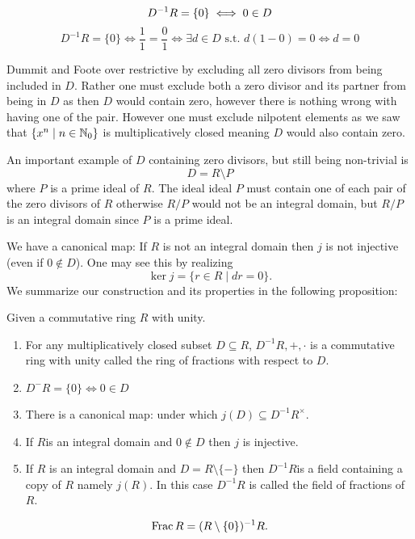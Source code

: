 \documentclass[master.tex]{subfiles}
\begin{document}
  \begin{rmk*}
    \[D^{-1}R = \{0\} \iff 0 \in D\\\]
    \[D^{-1}R = \{0\} \iff \frac{1}{1}=\frac{0}{1} \iff \exists d \in D \text{ s.t. } d(1-0)=0 \iff d=0\]
  \end{rmk*}
  Dummit and Foote over restrictive by excluding all zero divisors from being included in \(D\). Rather one must exclude
  both a zero divisor and its partner from being in \(D\) as then \(D\) would contain zero, however there is nothing
  wrong with having one of the pair. However one must exclude nilpotent elements as we saw that
  \(\{x^n \mid n \in {\mathbb N}_0\}\) is multiplicatively closed meaning \(D\) would also contain zero.
  \begin{example*}
    An important example of \(D\) containing zero divisors, but still being non-trivial is
    \[D=R \setminus P\] where \(P\) is a prime ideal of \(R\). The ideal ideal \(P\) must contain one of each pair of
    the zero divisors of \(R\) otherwise \(R/P\) would not be an integral domain, but \(R/P\) is an integral domain
    since \(P\) is a prime ideal.
  \end{example*}
  We have a canonical map:  If \(R\) is not an integral domain then \(j\)
  is not injective (even if \(0 \not \in D\)). One may see this by realizing
  \[\ker j = \{r \in R \mid dr = 0\}.\]
  We summarize our construction and its properties in the following proposition:
  \begin{prop}Given a commutative ring \(R\) with unity.
    \begin{enumerate}[label=(\alph*)]
    \item For any multiplicatively closed subset \(D \subseteq R\), \(D^{-1}R,+,\cdot\) is a commutative ring with unity
      called the ring of fractions with respect to \(D\).
    \item \(D^{-}R=\{0\}\iff 0 \in D\)
    \item There is a canonical map:  under which
      \(j(D) \subseteq D^{-1}R^\times\).
    \item If \(R\)is an integral domain and \(0 \not \in D\) then \(j\) is injective.
    \item If \(R\) is an integral domain and \(D=R \setminus \{-\}\) then \(D^{-1}R\)is a field containing a copy of
      \(R \) namely \(j(R)\). In this case \(D^{-1}R\) is called the field of fractions of \(R\).
    \end{enumerate}
    \begin{notation}
      \[\operatorname{Frac}{R}=(R\setminus\{0\})^{-1}R.\]
    \end{notation}
  \end{prop}
\end{document}
